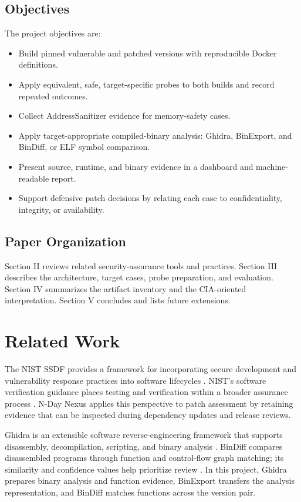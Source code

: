\documentclass[conference]{IEEEtran}
\newcommand{\tool}{N-Day Nexus}
\begin{document}
\subsection{Objectives}
The project objectives are:
\begin{itemize}
  \item Build pinned vulnerable and patched versions with reproducible Docker definitions.
  \item Apply equivalent, safe, target-specific probes to both builds and record repeated outcomes.
  \item Collect AddressSanitizer evidence for memory-safety cases.
  \item Apply target-appropriate compiled-binary analysis: Ghidra, BinExport, and BinDiff, or ELF symbol comparison.
  \item Present source, runtime, and binary evidence in a dashboard and machine-readable report.
  \item Support defensive patch decisions by relating each case to confidentiality, integrity, or availability.
\end{itemize}

\subsection{Paper Organization}
Section II reviews related security-assurance tools and practices. Section III describes the architecture, target cases, probe preparation, and evaluation. Section IV summarizes the artifact inventory and the CIA-oriented interpretation. Section V concludes and lists future extensions.

\section{Related Work}
The NIST SSDF provides a framework for incorporating secure development and vulnerability response practices into software lifecycles \cite{nistssdf}. NIST's software verification guidance places testing and verification within a broader assurance process \cite{nistverify}. \tool{} applies this perspective to patch assessment by retaining evidence that can be inspected during dependency updates and release reviews.

Ghidra is an extensible software reverse-engineering framework that supports disassembly, decompilation, scripting, and binary analysis \cite{ghidra}. BinDiff compares disassembled programs through function and control-flow graph matching; its similarity and confidence values help prioritize review \cite{bindiff}. In this project, Ghidra prepares binary analysis and function evidence, BinExport transfers the analysis representation, and BinDiff matches functions across the version pair.
\end{document}
